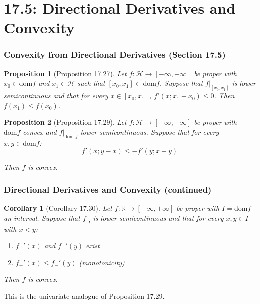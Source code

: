 \documentclass[aspectratio=169,10pt]{beamer}
\newtheorem{prop}{Proposition}
\newtheorem{cor}{Corollary}
\begin{document}
\section{17.5: Directional Derivatives and Convexity}
\begin{frame}
  \frametitle{Convexity from Directional Derivatives (Section 17.5)}

  \begin{prop}[Proposition 17.27]
    Let $f: \mathcal{H} \to [-\infty, +\infty]$ be proper with $x_0 \in \text{dom} f$ and $x_1 \in \mathcal{H}$ such that $[x_0, x_1] \subset \text{dom} f$. Suppose that $f|_{[x_0, x_1]}$ is lower semicontinuous and that for every $x \in [x_0, x_1]$, $f'(x; x_1 - x_0) \leq 0$. Then $f(x_1) \leq f(x_0)$.
  \end{prop}

  \begin{prop}[Proposition 17.29]
    Let $f: \mathcal{H} \to [-\infty, +\infty]$ be proper with $\text{dom} f$ convex and $f|_{\text{dom } f}$ lower semicontinuous. Suppose that for every $x, y \in \text{dom} f$:
    \[
    f'(x; y - x) \leq -f'(y; x - y)
    \]

    Then $f$ is convex.
  \end{prop}
\end{frame}

\begin{frame}
  \frametitle{Directional Derivatives and Convexity (continued)}

  \begin{cor}[Corollary 17.30]
    Let $f: \mathbb{R} \to [-\infty, +\infty]$ be proper with $I = \text{dom} f$ an interval. Suppose that $f|_I$ is lower semicontinuous and that for every $x, y \in I$ with $x < y$:
    \begin{enumerate}
      \item[(i)] $f_-'(x)$ and $f_-'(y)$ exist
      \item[(ii)] $f_-'(x) \leq f_-'(y)$ (monotonicity)
    \end{enumerate}

    Then $f$ is convex.
  \end{cor}

  This is the univariate analogue of Proposition 17.29.
\end{frame}
\end{document}
